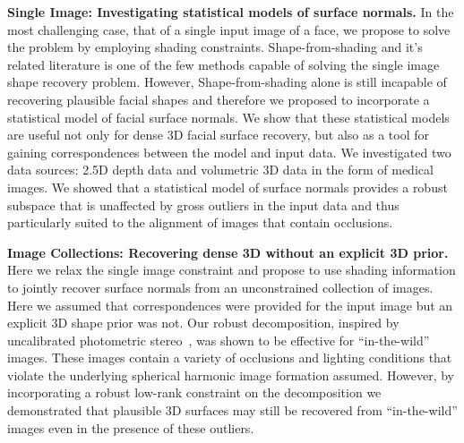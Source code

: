 \textbf{Single Image: Investigating statistical models of surface normals.}
In the most challenging case, that of a single
input image of a face, we propose to solve the problem by employing shading
constraints. Shape-from-shading and it's related literature is one of the
few methods capable of solving the single image shape recovery problem. However,
Shape-from-shading alone is still incapable of recovering plausible facial shapes
and therefore we proposed to incorporate a statistical model of facial surface
normals. We show that these statistical models are useful not only for dense
3D facial surface recovery, but also as a tool for gaining correspondences
between the model and input data. We investigated two data sources: 2.5D
depth data and volumetric 3D data in the form of medical images. We showed
that a statistical model of surface normals provides a robust subspace that
is unaffected by gross outliers in the input data and thus particularly suited
to the alignment of images that contain occlusions.

\textbf{Image Collections: Recovering dense 3D without an explicit 3D prior.}
Here we relax the single image constraint and propose to use shading information
to jointly recover surface normals from an unconstrained collection of images.
Here we assumed that correspondences were provided for the input image but
an explicit 3D shape prior was not. Our robust decomposition, inspired by
uncalibrated photometric stereo~\cite{basri2007photometric}, was shown to
be effective for ``in-the-wild'' images. These images contain a variety of
occlusions and lighting conditions that violate the underlying spherical
harmonic image formation assumed. However, by incorporating a robust low-rank
constraint on the decomposition we demonstrated that plausible 3D surfaces
may still be recovered from ``in-the-wild'' images even in the presence
of these outliers.

